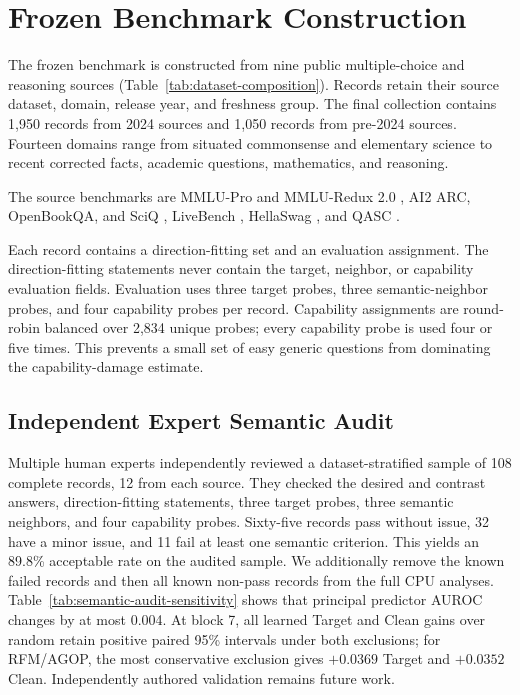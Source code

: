 \section{Frozen Benchmark Construction}

The frozen benchmark is constructed from nine public multiple-choice and
reasoning sources (Table~\ref{tab:dataset-composition}). Records retain their
source dataset, domain, release year, and freshness group. The final collection
contains 1,950 records from 2024 sources and 1,050 records from pre-2024
sources. Fourteen domains range from situated commonsense and elementary
science to recent corrected facts, academic questions, mathematics, and
reasoning.

The source benchmarks are MMLU-Pro and MMLU-Redux 2.0
\citep{wang2024mmlupro,gema2024mmluredux}, AI2 ARC, OpenBookQA, and SciQ
\citep{clark2018arc,mihaylov-etal-2018-suit,welbl-etal-2017-crowdsourcing},
LiveBench \citep{white2025livebench}, HellaSwag
\citep{zellers-etal-2019-hellaswag}, and QASC \citep{khot2020qasc}.



Each record contains a direction-fitting set and an evaluation assignment. The
direction-fitting statements never contain the target, neighbor, or capability
evaluation fields. Evaluation uses three target probes, three semantic-neighbor
probes, and four capability probes per record. Capability assignments are
round-robin balanced over 2,834 unique probes; every capability probe is used
four or five times. This prevents a small set of easy generic questions from
dominating the capability-damage estimate.

\subsection{Independent Expert Semantic Audit}

Multiple human experts independently reviewed a dataset-stratified sample of
108 complete records, 12 from each source. They checked the desired and contrast
answers, direction-fitting statements, three target probes, three semantic
neighbors, and four capability probes. Sixty-five records pass without issue,
32 have a minor issue, and 11 fail
at least one semantic criterion. This yields an 89.8\% acceptable rate on the
audited sample. We additionally remove the known failed records and then all known
non-pass records from the full CPU analyses. Table~\ref{tab:semantic-audit-sensitivity}
shows that principal predictor AUROC changes by at most 0.004. At block 7, all
learned Target and Clean gains over random retain positive paired 95\%
intervals under both exclusions; for RFM/AGOP, the most conservative exclusion
gives $+0.0369$ Target and $+0.0352$ Clean. Independently authored validation
remains future work.

